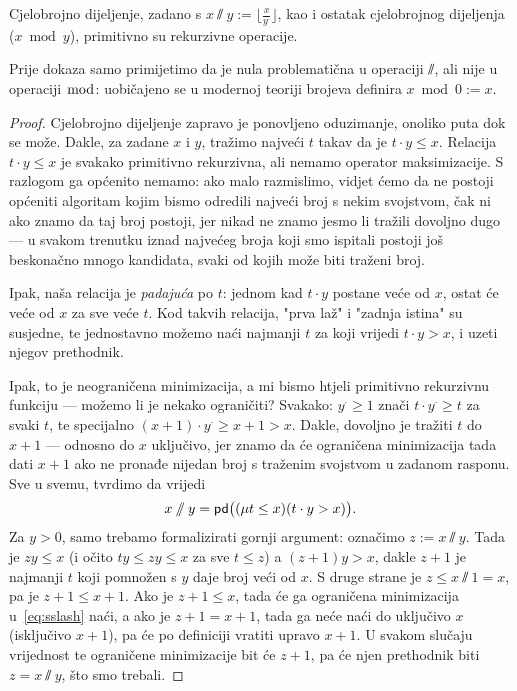 \begin{propozicija}\label{prop:divmodprn}
    Cjelobrojno dijeljenje, zadano s $x\sslash y:=\bigl\lfloor\frac{x}{y^\cdot}\bigr\rfloor$, kao i ostatak cjelobrojnog dijeljenja ($x\bmod y$), primitivno su rekurzivne operacije.
\end{propozicija}
Prije dokaza samo primijetimo da je nula problematična u operaciji $\sslash$, ali nije u operaciji $\bmod$: uobičajeno se u modernoj teoriji brojeva definira $x\bmod 0:=x$.
\begin{proof}
Cjelobrojno dijeljenje zapravo je ponovljeno oduzimanje, onoliko puta dok se može. Dakle, za zadane $x$ i $y$, tražimo najveći $t$ takav da je $t\cdot y\le x$. Relacija $t\cdot y\le x$ je svakako primitivno rekurzivna, ali nemamo operator maksimizacije. S razlogom ga općenito nemamo: ako malo razmislimo, vidjet ćemo da ne postoji općeniti algoritam kojim bismo odredili najveći broj s nekim svojstvom, čak ni ako znamo da taj broj postoji, jer nikad ne znamo jesmo li tražili dovoljno dugo --- u svakom trenutku iznad najvećeg broja koji smo ispitali postoji još beskonačno mnogo kandidata, svaki od kojih može biti traženi broj.

Ipak, naša relacija je \emph{padajuća} po $t$: jednom kad $t\cdot y$ postane veće od $x$, ostat će veće od $x$ za sve veće $t$. Kod takvih relacija, "prva laž" i "zadnja istina" su susjedne, te jednostavno možemo naći najmanji $t$ za koji vrijedi $t\cdot y>x$, i uzeti njegov prethodnik.

Ipak, to je neograničena minimizacija, a mi bismo htjeli primitivno rekurzivnu funkciju --- možemo li je nekako ograničiti? Svakako: $y^\cdot\ge 1$ znači $t\cdot y^\cdot\ge t$ za svaki $t$, te specijalno $(x+1)\cdot y^\cdot\ge x+1>x$. Dakle, dovoljno je tražiti $t$ do $x+1$ --- odnosno do $x$ uključivo, jer znamo da će ograničena minimizacija tada dati $x+1$ ako ne pronađe nijedan broj s traženim svojstvom u zadanom rasponu. Sve u svemu, tvrdimo da vrijedi
\begin{equation}\label{eq:sslash}
    x\sslash y=\mathsf{pd}\bigl((\mu t\le x)(t\cdot y>x)\bigr)\text.
\end{equation}
Za $y>0$, samo trebamo formalizirati gornji argument: označimo $z:=x\sslash y$. Tada je $zy\le x$ (i očito $ty\le zy\le x$ za sve $t\le z$) a $(z+1)y>x$, dakle $z+1$ je najmanji $t$ koji pomnožen s $y$ daje broj veći od $x$. S druge strane je $z\le x\sslash1=x$, pa je $z+1\le x+1$. Ako je $z+1\le x$, tada će ga ograničena minimizacija u~\eqref{eq:sslash} naći, a ako je $z+1=x+1$, tada ga neće naći do uključivo $x$ (isključivo $x+1$), pa će po definiciji vratiti upravo $x+1$. U svakom slučaju vrijednost te ograničene minimizacije bit će $z+1$, pa će njen prethodnik biti $z=x\sslash y$, što smo trebali.


\end{proof}
